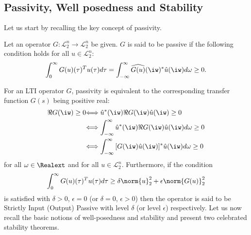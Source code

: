 %
\subsection{Passivity, Well posedness and Stability}
Let us start by recalling the key concept of passivity.
\begin{define} Let an operator $G: \mathcal{L}_{2}^n\to\mathcal{L}_{2}^n$ be given. $G$ is said to be passive if the following condition holds for all $u\in\mathcal{L}_{2}^n$:
\[
\int_0^\infty{G(u)(\tau)^Tu(\tau)d\tau} = \int_{-\infty}^\infty{\widehat{G(u)}(\iw)^*\hat{u}(\iw)d\omega} \geq 0.
\]\end{define}
For an LTI operator $G$, passivity is equivalent to the corresponding transfer function $G(s)$ being positive real:
\begin{align*}
{\Re{G(\iw)}\geq 0} &{\Longleftrightarrow
\hat{u}^*(\iw) \Re{G(\iw)}\hat{u}(\iw) \geq 0}\\
&{\Longleftrightarrow \int_{-\infty}^\infty{\hat{u}^*(\iw)\Re{G(\iw)} \hat{u}(\iw)d\omega} \geq 0}\\
&{\Longleftrightarrow \int_{-\infty}^\infty{{[G(\iw)\hat{u}(\iw)]^*}\hat{u}(\iw)d\omega} \geq 0}
\end{align*}
for all $\omega\in\Realext$ and for all $u\in\mathcal{L}_{2}^n$. Furthermore, if the condition
\[
\int_0^\infty{G(u)(\tau)^Tu(\tau)d\tau} \geq \delta\norm{u}_2^2 + \epsilon\norm{G(u)}_2^2
\]
is satisfied with {$\delta > 0$, $\epsilon = 0$ (or $\delta = 0$, $\epsilon > 0$) then the operator is said to be Strictly Input (Output) Passive with level $\delta$ (or level $\epsilon$) respectively.} {Let us now recall the} basic notions of well-posedness and stability and {present} two celebrated stability theorems.

